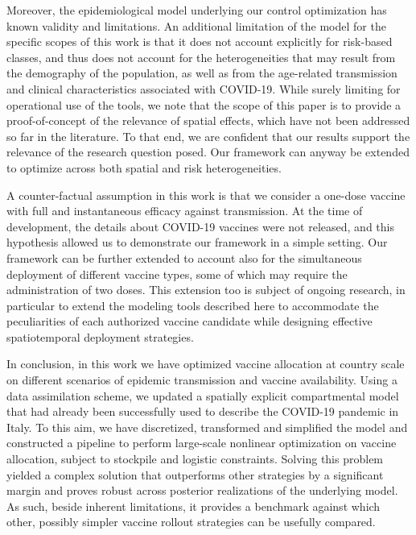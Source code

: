 Moreover, the epidemiological model underlying our control optimization has known validity and limitations\cite{Gatto:SpreadDynamicsCOVID19:2020, Bertuzzo:GeographyCOVID19Spread:2020}. An additional limitation of the model for the specific scopes of this work is that it does not account explicitly for risk-based classes, and thus does not account for the heterogeneities that may result from the demography of the population, as well as from the age-related transmission and clinical characteristics associated with COVID-19. While surely limiting for operational use of the tools, we note that the scope of this paper is to provide a proof-of-concept of the relevance of spatial effects, which have not been addressed so far in the literature. To that end, we are confident that our results support the relevance of the research question posed. Our framework can anyway be extended to optimize across both spatial and risk heterogeneities. 

A counter-factual assumption in this work is that we consider a one-dose vaccine with full and instantaneous efficacy against transmission. At the time of development, the details about COVID-19 vaccines were not released, and this hypothesis allowed us to demonstrate our framework in a simple setting. Our framework can be further extended to account also for the simultaneous deployment of different vaccine types, some of which may require the administration of two doses. This extension too is subject of ongoing research, in particular to extend the modeling tools described here to accommodate the peculiarities of each authorized vaccine candidate while designing effective spatiotemporal deployment strategies.

In conclusion, in this work we have optimized vaccine allocation at country scale on different scenarios of epidemic transmission and vaccine availability. Using a data assimilation scheme, we updated a spatially explicit compartmental model that had already been successfully used to describe the COVID-19 pandemic in Italy. To this aim, we have discretized, transformed and simplified the model and constructed a pipeline to perform large-scale nonlinear optimization on vaccine allocation, subject to stockpile and logistic constraints. Solving this problem yielded a complex solution that outperforms other strategies by a significant margin and proves robust across posterior realizations of the underlying model. As such, beside inherent limitations, it provides a benchmark against which other, possibly simpler vaccine rollout strategies can be usefully compared.

